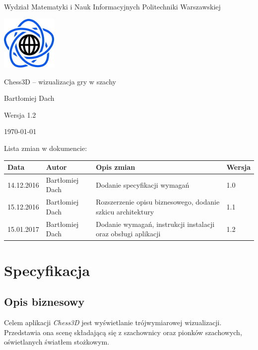 \documentclass[10pt,a4paper]{article}
\begin{document}
\begin{titlepage}
	\centering
	{\Large Wydział Matematyki i Nauk Informacyjnych Politechniki Warszawskiej \par}
	\vspace{1cm}
	\includegraphics[width=0.2\textwidth]{logo.png} \par
	\vspace{5cm}
	{\LARGE Chess3D -- wizualizacja gry w szachy \par}
	\vspace{0.5cm}
	{\Large Bartłomiej Dach \par}
	\vspace{1.5cm}
	{\Large Wersja 1.2 \par}
	\vspace{1.5cm}
	{\Large \today \par}
\end{titlepage}
Lista zmian w dokumencie:
\begin{table}[H]
\def\arraystretch{1.5}
\begin{tabularx}{\textwidth}{|l|l|X|l|}
	\hline
	\textbf{Data} & \textbf{Autor} & \textbf{Opis zmian} & \textbf{Wersja} \\
	\hline
	14.12.2016 & Bartłomiej Dach & Dodanie specyfikacji wymagań & 1.0 \\
	\hline
	15.12.2016 & Bartłomiej Dach & Rozszerzenie opisu biznesowego, dodanie szkicu architektury & 1.1 \\
	\hline
	15.01.2017 & Bartłomiej Dach & Dodanie wymagań, instrukcji instalacji oraz obsługi aplikacji & 1.2 \\
	\hline
\end{tabularx}
\end{table}

\tableofcontents
\newpage

\section{Specyfikacja}

\subsection{Opis biznesowy}
Celem aplikacji \emph{Chess3D} jest wyświetlanie trójwymiarowej wizualizacji. Przedstawia ona scenę składającą się z szachownicy oraz pionków szachowych, oświetlanych światłem stożkowym.
\end{document}
